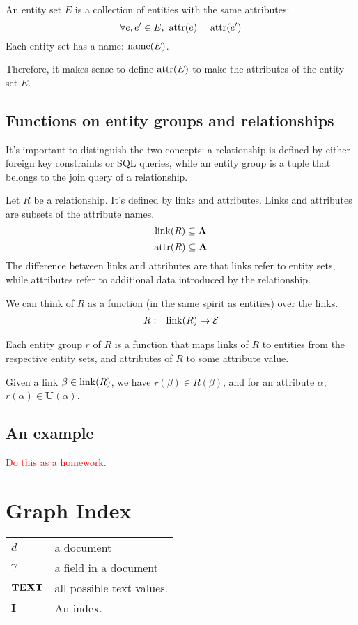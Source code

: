 \documentclass{article}
\begin{document}
An entity set $E$ is a collection of entities with the same attributes:
$$\forall e, e'\in E,\ \operatorname{attr}(e) = \operatorname{attr}(e')$$
Each entity set has a name: $\operatorname{name}(E)$.

Therefore, it makes sense to define $\operatorname{attr}(E)$ to make the attributes of the
entity set $E$.

\subsection{Functions on entity groups and relationships}

It's important to distinguish the two concepts: a relationship is defined by
either foreign key constraints or SQL queries, while an entity group is a tuple
that belongs to the join query of a relationship.

Let $R$ be a relationship.  It's defined by links and attributes.
Links and attributes are subsets of the attribute names.
$$\operatorname{link}(R)\subseteq\mathbf{A}$$
$$\operatorname{attr}(R)\subseteq\mathbf{A}$$
The difference between links and attributes are that links refer to entity sets,
while attributes refer to additional data introduced by the relationship.

We can think of $R$ as a function (in the same spirit as entities) over the
links.
\begin{eqnarray*}
  R &:& \operatorname{link}(R) \to \mathcal{E} \\
\end{eqnarray*}

Each entity group $r$ of $R$ is a function that maps links of $R$ to entities
from the respective entity sets, and attributes of $R$ to some attribute value.

Given a link $\beta\in\operatorname{link}(R)$, we have 
$r(\beta)\in R(\beta)$, and for an attribute $\alpha$,
$r(\alpha)\in\mathbf{U}(\alpha)$.

\subsection{An example}

\textcolor{red}{Do this as a homework.}

\section{Graph Index}

\begin{tabular}{|l|p{4in}|}\hline
$d$ & a document \\
$\gamma$ & a field in a document \\
$\mathbf{TEXT}$ & all possible text values.\\
$\mathbf{I}$ & An index.\\ \hline
\end{tabular}
\end{document}
